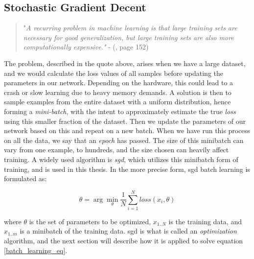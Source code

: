 \subsection{Stochastic Gradient Decent} \label{batch learning}
        \begin{quote}
        "\textit{A recurring problem in machine learning is that large training sets are necessary for good generalization, but large training sets are also more computationally
        expensive."} - (\citeauthor{Goodfellow-et-al-2016_SGD}\citeyear{Goodfellow-et-al-2016_SGD}, page 152)
    \end{quote}
    
    The problem, described in the quote above, arises when we have a large dataset, and we would calculate the loss values of all samples before updating the parameters in our network\cite{Goodfellow-et-al-2016_SGD}. Depending on the hardware, this could lead to a crash or slow learning due to heavy memory demands. A solution is then to sample examples from the entire dataset with a uniform distribution, hence forming a \textit{mini-batch}, with the intent to approximately estimate the true \textit{loss} using this smaller fraction of the dataset. Then we update the parameters of our network based on this and repeat on a new batch. When we have run this process on all the data, we say that an \textit{epoch} has passed. The size of this minibatch can vary from one example, to hundreds, and the size chosen can heavily affect training\cite{wilson2001need_learning_rate}. A widely used algorithm is \textit{\gls{sgd}}\cite{Goodfellow-et-al-2016_SGD}, which utilizes this minibatch form of training, and is used in this thesis. In the more precise form, \gls{sgd} batch learning is formulated as\cite{pmlr-v37-ioffe15_batch_norm}:
    
        \begin{equation} \label{batch_learning_eq}
            \theta = \arg \min_{\theta}\dfrac{1}{N} \sum^{N}_{i=1} loss (x_{i},\theta)
        \end{equation}
    
    where $\theta$ is the set of parameters to be optimized, $x_{1..N}$ is the training data, and $x_{1..m}$ is a minibatch of the training data. \gls{sgd} is what is called an \textit{optimization} algorithm, and the next section will describe how it is applied to solve equation \ref{batch_learning_eq}. 
    
    
